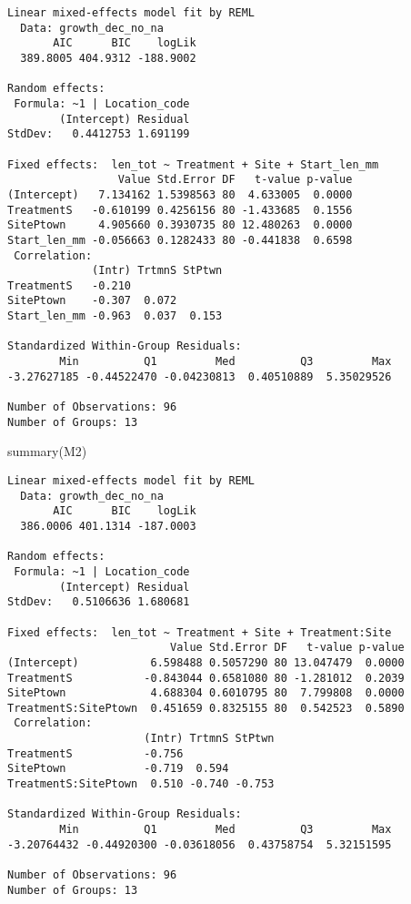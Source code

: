 \documentclass[
  letterpaper,
  DIV=11,
  numbers=noendperiod]{scrartcl}
\newenvironment{Shaded}{\begin{snugshade}}{\end{snugshade}}
\newcommand{\FunctionTok}[1]{\textcolor[rgb]{0.28,0.35,0.67}{#1}}
\newcommand{\NormalTok}[1]{\textcolor[rgb]{0.00,0.23,0.31}{#1}}
\begin{document}
\begin{verbatim}
Linear mixed-effects model fit by REML
  Data: growth_dec_no_na 
       AIC      BIC    logLik
  389.8005 404.9312 -188.9002

Random effects:
 Formula: ~1 | Location_code
        (Intercept) Residual
StdDev:   0.4412753 1.691199

Fixed effects:  len_tot ~ Treatment + Site + Start_len_mm 
                 Value Std.Error DF   t-value p-value
(Intercept)   7.134162 1.5398563 80  4.633005  0.0000
TreatmentS   -0.610199 0.4256156 80 -1.433685  0.1556
SitePtown     4.905660 0.3930735 80 12.480263  0.0000
Start_len_mm -0.056663 0.1282433 80 -0.441838  0.6598
 Correlation: 
             (Intr) TrtmnS StPtwn
TreatmentS   -0.210              
SitePtown    -0.307  0.072       
Start_len_mm -0.963  0.037  0.153

Standardized Within-Group Residuals:
        Min          Q1         Med          Q3         Max 
-3.27627185 -0.44522470 -0.04230813  0.40510889  5.35029526 

Number of Observations: 96
Number of Groups: 13 
\end{verbatim}

\begin{Shaded}
\begin{Highlighting}[]
  \FunctionTok{summary}\NormalTok{(M2)}
\end{Highlighting}
\end{Shaded}

\begin{verbatim}
Linear mixed-effects model fit by REML
  Data: growth_dec_no_na 
       AIC      BIC    logLik
  386.0006 401.1314 -187.0003

Random effects:
 Formula: ~1 | Location_code
        (Intercept) Residual
StdDev:   0.5106636 1.680681

Fixed effects:  len_tot ~ Treatment + Site + Treatment:Site 
                         Value Std.Error DF   t-value p-value
(Intercept)           6.598488 0.5057290 80 13.047479  0.0000
TreatmentS           -0.843044 0.6581080 80 -1.281012  0.2039
SitePtown             4.688304 0.6010795 80  7.799808  0.0000
TreatmentS:SitePtown  0.451659 0.8325155 80  0.542523  0.5890
 Correlation: 
                     (Intr) TrtmnS StPtwn
TreatmentS           -0.756              
SitePtown            -0.719  0.594       
TreatmentS:SitePtown  0.510 -0.740 -0.753

Standardized Within-Group Residuals:
        Min          Q1         Med          Q3         Max 
-3.20764432 -0.44920300 -0.03618056  0.43758754  5.32151595 

Number of Observations: 96
Number of Groups: 13 
\end{verbatim}
\end{document}
